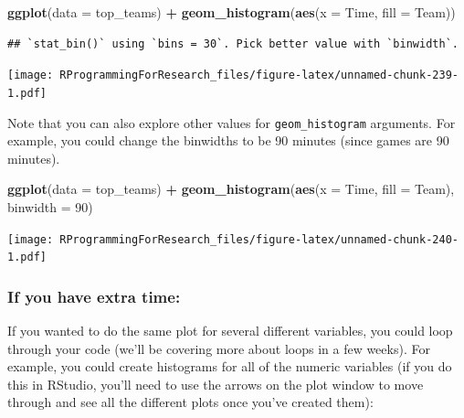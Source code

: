\documentclass[]{book}
\makeatletter
\newenvironment{Shaded}{\begin{snugshade}}{\end{snugshade}}
\newcommand{\KeywordTok}[1]{\textcolor[rgb]{0.13,0.29,0.53}{\textbf{#1}}}
\newcommand{\DataTypeTok}[1]{\textcolor[rgb]{0.13,0.29,0.53}{#1}}
\newcommand{\DecValTok}[1]{\textcolor[rgb]{0.00,0.00,0.81}{#1}}
\newcommand{\StringTok}[1]{\textcolor[rgb]{0.31,0.60,0.02}{#1}}
\newcommand{\OperatorTok}[1]{\textcolor[rgb]{0.81,0.36,0.00}{\textbf{#1}}}
\newcommand{\NormalTok}[1]{#1}
\newenvironment{kframe}{%
\medskip{}
\setlength{\fboxsep}{.8em}
 \def\at@end@of@kframe{}%
 \ifinner\ifhmode%
  \def\at@end@of@kframe{\end{minipage}}%
  \begin{minipage}{\columnwidth}%
 \fi\fi%
 \def\FrameCommand##1{\hskip\@totalleftmargin \hskip-\fboxsep
 \colorbox{shadecolor}{##1}\hskip-\fboxsep
     \hskip-\linewidth \hskip-\@totalleftmargin \hskip\columnwidth}%
 \MakeFramed {\advance\hsize-\width
   \@totalleftmargin\z@ \linewidth\hsize
   \@setminipage}}%
 {\par\unskip\endMakeFramed%
 \at@end@of@kframe}
\renewenvironment{Shaded}{\begin{kframe}}{\end{kframe}}
\theoremstyle{definition}
\theoremstyle{definition}
\theoremstyle{definition}
\theoremstyle{remark}
\makeatother
\begin{document}
\begin{Shaded}
\begin{Highlighting}[]
\KeywordTok{ggplot}\NormalTok{(}\DataTypeTok{data =}\NormalTok{ top_teams) }\OperatorTok{+}\StringTok{ }
\StringTok{  }\KeywordTok{geom_histogram}\NormalTok{(}\KeywordTok{aes}\NormalTok{(}\DataTypeTok{x =}\NormalTok{ Time, }\DataTypeTok{fill =}\NormalTok{ Team))}
\end{Highlighting}
\end{Shaded}

\begin{verbatim}
## `stat_bin()` using `bins = 30`. Pick better value with `binwidth`.
\end{verbatim}

\texttt{[image: RProgrammingForResearch\_files/figure-latex/unnamed-chunk-239-1.pdf]}

Note that you can also explore other values for \texttt{geom\_histogram}
arguments. For example, you could change the binwidths to be 90 minutes
(since games are 90 minutes).

\begin{Shaded}
\begin{Highlighting}[]
\KeywordTok{ggplot}\NormalTok{(}\DataTypeTok{data =}\NormalTok{ top_teams) }\OperatorTok{+}\StringTok{ }
\StringTok{  }\KeywordTok{geom_histogram}\NormalTok{(}\KeywordTok{aes}\NormalTok{(}\DataTypeTok{x =}\NormalTok{ Time, }\DataTypeTok{fill =}\NormalTok{ Team), }\DataTypeTok{binwidth =} \DecValTok{90}\NormalTok{)}
\end{Highlighting}
\end{Shaded}

\texttt{[image: RProgrammingForResearch\_files/figure-latex/unnamed-chunk-240-1.pdf]}

\subsubsection{If you have extra time:}\label{if-you-have-extra-time}

If you wanted to do the same plot for several different variables, you
could loop through your code (we'll be covering more about loops in a
few weeks). For example, you could create histograms for all of the
numeric variables (if you do this in RStudio, you'll need to use the
arrows on the plot window to move through and see all the different
plots once you've created them):
\end{document}
